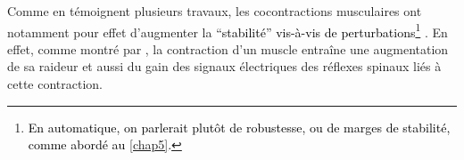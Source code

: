 Comme en témoignent plusieurs travaux, les cocontractions musculaires ont notamment pour effet d'augmenter la \textcolor{black}{\foreignquote{french}{stabilité} vis-à-vis de perturbations}\footnote{\textcolor{black}{En automatique, on parlerait plutôt de robustesse, ou de marges de stabilité, comme abordé au \cref{chap5}.}} \parencite{granata_costbenefit_2000, milner_adaptation_2002, gribble_role_2003, darainy_muscle_2008}. En effet, comme montré par \textcite{ford_tension_1977, zahalak_quantitative_1979}, la contraction d'un muscle entraîne une augmentation de sa raideur et aussi du gain des signaux électriques des réflexes spinaux liés à cette contraction. %



%

